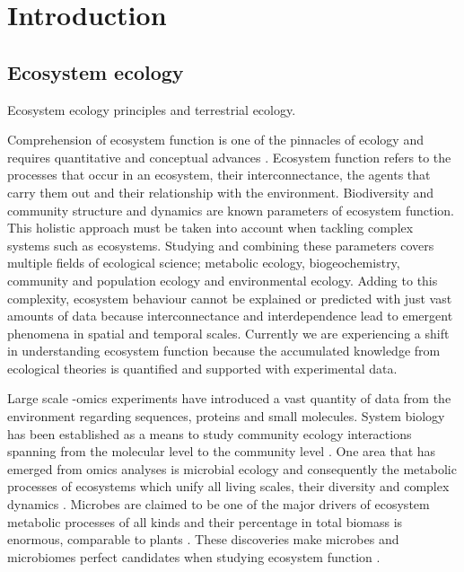 % 
% 


\chapter{Introduction}
\label{cha:intro}


\section{Ecosystem ecology}
\label{sec:intro-ecosystem}

Ecosystem ecology principles \citep{Chapin_Matson_Vitousek_2011} and terrestrial
ecology. 

Comprehension of ecosystem function is one of the pinnacles of ecology and
requires quantitative and conceptual advances \citep{Chapin_Matson_Vitousek_2011}.
Ecosystem function refers to the processes that occur in an ecosystem, their
interconnectance, the agents that carry them out
and their relationship with the environment. Biodiversity
\citep{hooperEFFECTSBIODIVERSITYECOSYSTEM2005, loreau2001Biodiversity}
and community structure and dynamics \citep{gonze2018Microbial,morris2020Linking}
are known parameters of ecosystem function. This holistic approach must be taken
into account when tackling complex systems such as ecosystems. Studying and
combining these parameters covers multiple fields of ecological science;
metabolic ecology, biogeochemistry, community and population ecology and
environmental ecology. Adding to this complexity, ecosystem behaviour cannot be
explained or predicted with just vast amounts of data because interconnectance
and interdependence lead to emergent phenomena in spatial and temporal scales.
Currently we are experiencing a shift in understanding ecosystem function
because the accumulated knowledge from ecological theories is quantified and
supported with experimental data.

Large scale -omics experiments have introduced a vast quantity of data from the
environment regarding sequences, proteins and small molecules. System biology
has been established as a means to study community ecology interactions spanning
from the molecular level to the community level \citep{raes2008molecular}.
One area that has emerged from omics analyses is microbial ecology and
consequently the metabolic processes of ecosystems \citep{perez_garcia2016Metabolic}
which unify all living scales, their diversity and complex dynamics \citep{smith2016Origin}.
Microbes are claimed to be one of the major drivers of ecosystem metabolic
processes of all kinds \citep{falkowski2008microbial,hall2018understanding} and
their percentage in total biomass is enormous, comparable to plants \citep{bar2018biomass}.
These discoveries make microbes and microbiomes perfect candidates when
studying ecosystem function \citep{klitgord2011Ecosystems,widder2016Challenges}.

